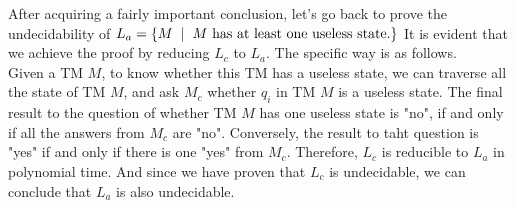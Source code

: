 \documentclass[11pt,a4paper]{article}
\newcommand{\htab}{\hspace*{0.63cm}}
\newcommand{\ba}{\hspace*{0.2cm} | \hspace*{0.2cm}}
\begin{document}
 \htab After acquiring a fairly important conclusion, let's go back to prove the undecidability of 
 $L_{a} = \{ M \ba M \text{ has at least one useless state.}\}$ It is evident that we achieve the
 proof by reducing $L_{c}$ to $L_{a}$. The specific way is as follows. \\
 \htab Given a TM $M$, to know whether this TM has a useless state, we can traverse all the state 
 of TM $M$, and ask $M_{c}$ whether $q_{i}$ in TM $M$ is a useless state. The final result to the 
 question of whether TM $M$ has one useless state is "no", if and only if all the answers from
 $M_{c}$ are "no". Conversely, the result to taht question is "yes" if and only if 
 there is one "yes" from $M_{c}$. Therefore, $L_{c}$ is reducible to $L_{a}$ in polynomial time.
 And since we have proven that $L_{c}$ is undecidable, we can conclude that $L_{a}$ is also undecidable.
\newpage
\newcommand{\lie}{L_{ie}}
\newcommand{\lnw}{L\big(N(w)\big)}
\end{document}
